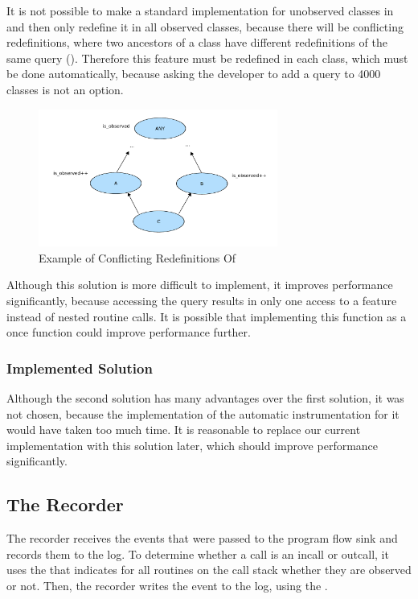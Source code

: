 It is not possible to make a standard implementation for unobserved classes in  and then only redefine it in all observed classes, because there will be conflicting redefinitions, where two ancestors of a class have different redefinitions of the same query \cite{oosc2} (). Therefore this feature must be redefined in each class, which must be done automatically, because asking the developer to add a query to 4000 classes is not an option.
\begin{figure}[ht]
  \centering
  \includegraphics[width=0.7\textwidth]{illustrations/observed_query_conflicting_redefinitions}
  \caption{Example of Conflicting Redefinitions Of }
  \label{fig:observed_query_conflicting_redefinitions}
\end{figure}

Although this solution is more difficult to implement, it improves performance significantly, because accessing the query results in only one access to a feature instead of nested routine calls. It is possible that implementing this function as a once function could improve performance further.


\subsubsection {Implemented Solution}
Although the second solution has many advantages over the first solution, it was not chosen, because the implementation of the automatic instrumentation for it would have taken too much time. It is reasonable to replace our current implementation with this solution later, which should improve performance significantly.


\subsection{The Recorder}
The recorder receives the events that were passed to the program flow sink and records them to the log. To determine whether a call is an incall or outcall, it uses the  that indicates for all routines on the call stack whether they are observed or not. Then, the recorder writes the event to the log, using the .


